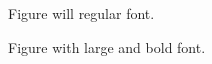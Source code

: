 \documentclass{article}
\begin{document}
\begin{figure}
    \centering
    
    \caption{Figure will regular font.}
    \label{fig:example}
\end{figure}

\begin{figure}
    \centering
    {\bf\Large
        
    }
    \caption{Figure with large and bold font.}
    \label{fig:example2}
\end{figure}
\end{document}
